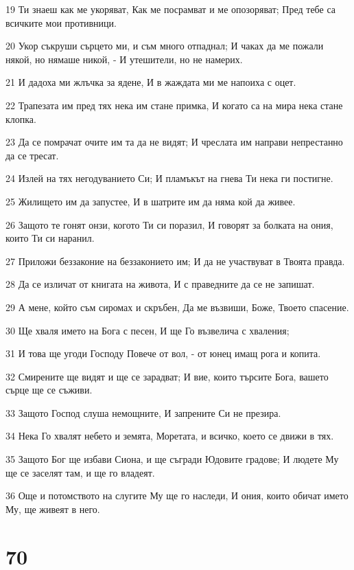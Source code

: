 \par 19 Ти знаеш как ме укоряват, Как ме посрамват и ме опозоряват; Пред тебе са всичките мои противници.
\par 20 Укор съкруши сърцето ми, и съм много отпаднал; И чаках да ме пожали някой, но нямаше никой, - И утешители, но не намерих.
\par 21 И дадоха ми жлъчка за ядене, И в жаждата ми ме напоиха с оцет.
\par 22 Трапезата им пред тях нека им стане примка, И когато са на мира нека стане клопка.
\par 23 Да се помрачат очите им та да не видят; И чреслата им направи непрестанно да се тресат.
\par 24 Излей на тях негодуванието Си; И пламъкът на гнева Ти нека ги постигне.
\par 25 Жилището им да запустее, И в шатрите им да няма кой да живее.
\par 26 Защото те гонят онзи, когото Ти си поразил, И говорят за болката на ония, които Ти си наранил.
\par 27 Приложи беззаконие на беззаконието им; И да не участвуват в Твоята правда.
\par 28 Да се изличат от книгата на живота, И с праведните да се не запишат.
\par 29 А мене, който съм сиромах и скръбен, Да ме възвиши, Боже, Твоето спасение.
\par 30 Ще хваля името на Бога с песен, И ще Го възвелича с хваления;
\par 31 И това ще угоди Господу Повече от вол, - от юнец имащ рога и копита.
\par 32 Смирените ще видят и ще се зарадват; И вие, които търсите Бога, вашето сърце ще се съживи.
\par 33 Защото Господ слуша немощните, И запрените Си не презира.
\par 34 Нека Го хвалят небето и земята, Моретата, и всичко, което се движи в тях.
\par 35 Защото Бог ще избави Сиона, и ще съгради Юдовите градове; И людете Му ще се заселят там, и ще го владеят.
\par 36 Още и потомството на слугите Му ще го наследи, И ония, които обичат името Му, ще живеят в него.

\chapter{70}

